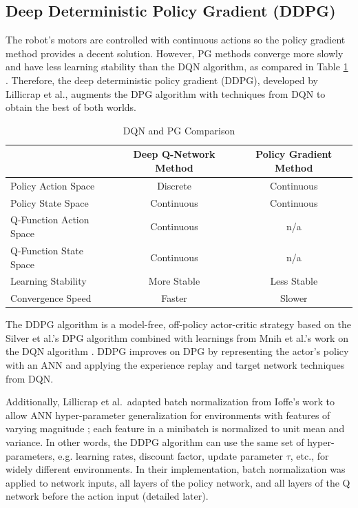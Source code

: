 \subsection{Deep Deterministic Policy Gradient (DDPG)}
The robot's motors are controlled with continuous actions so the policy gradient method provides a decent solution. However, PG methods converge more slowly and have less learning stability than the DQN algorithm, as compared in Table \ref{tab:dqn_pg_comparison} \cite{yu_dqn_vs_pg}. Therefore, the deep deterministic policy gradient (DDPG), developed by Lillicrap et al., augments the DPG algorithm with techniques from DQN to obtain the best of both worlds.
\begin{table}[h]
	\caption{DQN and PG Comparison \cite{yu_dqn_vs_pg}}  \label{tab:dqn_pg_comparison}
	\begin{tabularx}{\textwidth}{@{} l|c|c @{}}
		\toprule
		& Deep Q-Network Method & Policy Gradient Method \\ 
		\midrule
		Policy Action Space & Discrete & Continuous \\
		Policy State Space & Continuous & Continuous \\
		Q-Function Action Space & Continuous & n/a \\
		Q-Function State Space & Continuous & n/a \\
		Learning Stability & More Stable & Less Stable \\
		Convergence Speed & Faster & Slower \\
		\bottomrule
	\end{tabularx} 
\end{table}

The DDPG algorithm is a model-free, off-policy actor-critic strategy based on the Silver et al.'s DPG algorithm combined with learnings from Mnih et al.'s work on the DQN algorithm \cite{lillicrap_2016}\cite{Mnih_2015}\cite{silver_lever_heess_degris_wierstra_riedmiller}. DDPG improves on DPG by representing the actor's policy with an ANN and applying the experience replay and target network techniques from DQN. 

Additionally, Lillicrap et al.\ adapted batch normalization from Ioffe's work to allow ANN hyper-parameter generalization for environments with features of varying magnitude \cite{2015arXiv150203167I}; each feature in a minibatch is normalized to unit mean and variance. In other words, the DDPG algorithm can use the same set of hyper-parameters, e.g. learning rates, discount factor, update parameter $\tau$, etc., for widely different environments. In their implementation, batch normalization was applied to network inputs, all layers of the policy network, and all layers of the Q network before the action input (detailed later).

